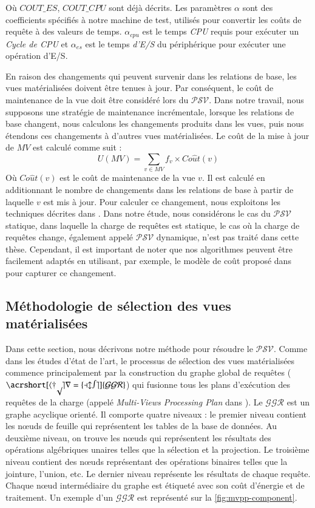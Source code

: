 Où $COUT\_ES$, $COUT\_CPU$ sont déjà décrits. Les paramètres $\alpha$ sont des coefficients spécifiés à notre machine de test, utilisés pour convertir les coûts de requête à des valeurs de temps. $\alpha_{cpu}$ est le temps \textit{CPU} requis pour exécuter un \textit{Cycle de CPU} et $\alpha_{es}$ est le temps \textit{d'E/S} du périphérique pour exécuter une opération d'E/S.

En raison des changements qui peuvent survenir dans les relations de base, les vues matérialisées doivent être tenues à jour. Par conséquent, le coût de maintenance de la vue doit être considéré lors du $\mathcal{PSV}$.
Dans notre travail, nous supposons une stratégie de maintenance incrémentale, lorsque les relations de base changent, nous calculons les changements produits dans les vues, puis nous étendons ces changements à d'autres vues matérialisées. Le coût de la mise à jour de $MV$ est calculé comme suit :
\begin{equation}\label{eq:maint-cost-model}
 U(MV) = \sum_{v \in MV} f_v \times Co\hat{u}t(v)
\end{equation}
Où $Co\hat{u}t(v)$ est le coût de maintenance de la vue $v$. Il est calculé en additionnant le nombre de changements dans les relations de base à partir de laquelle $v$ est mis à jour. Pour calculer ce changement, nous exploitons les techniques décrites dans \cite{Mistry01}. Dans notre étude, nous considérons le cas du $\mathcal{PSV}$ statique, dans laquelle la charge de requêtes est statique, le cas où la charge de requêtes change, également appelé $\mathcal{PSV}$ dynamique, n'est pas traité dans cette thèse. Cependant, il est important de noter que nos algorithmes peuvent être facilement adaptés en utilisant, par exemple, le modèle de coût proposé dans \cite{Lawrence06b} pour capturer ce changement.

\subsection{Méthodologie de sélection des vues matérialisées}
Dans cette section, nous décrivons notre méthode pour résoudre le $\mathcal{PSV}$. Comme dans les études d'état de l'art, le processus de sélection des vues matérialisées commence principalement par la construction du graphe global de requêtes ($\mathcal{\acrshort[hyper=false]{GGR}}$) qui fusionne tous les plans d'exécution des requêtes de la charge (appelé \textit{Multi-Views Processing Plan} dans \cite{Yang97}). Le $\mathcal{GGR}$ est un graphe acyclique orienté. Il comporte quatre niveaux : le premier niveau contient les nœuds de feuille qui représentent les tables de la base de données. Au deuxième niveau, on trouve les nœuds qui représentent les résultats des opérations algébriques unaires telles que la sélection et la projection. Le troisième niveau contient des nœuds représentant des opérations binaires telles que la jointure, l'union, etc. Le dernier niveau représente les résultats de chaque requête. Chaque nœud intermédiaire du graphe est étiqueté avec son coût d'énergie et de traitement. Un exemple d'un $\mathcal{GGR}$ est représenté sur la \ref{fig:mvpp-component}.

